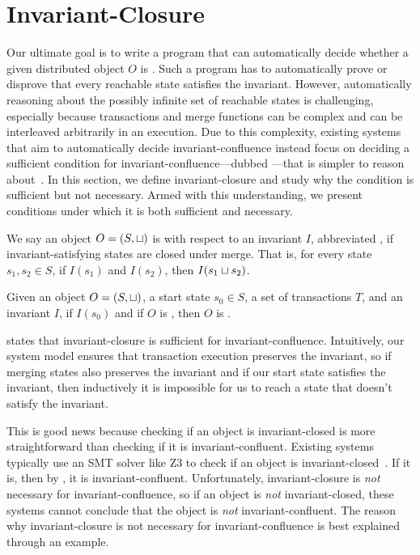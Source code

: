 \section{Invariant-Closure}
Our ultimate goal is to write a program that can automatically decide whether a
given distributed object $O$ is \sTIconfluent{}. Such a program has to
automatically prove or disprove that every reachable state satisfies the
invariant. However, automatically reasoning about the possibly infinite set of
reachable states is challenging, especially because transactions and merge
functions can be complex and can be interleaved arbitrarily in an execution.
Due to this complexity, existing systems that aim to automatically decide
invariant-confluence instead focus on deciding a sufficient condition for
invariant-confluence---dubbed ---that is simpler to
reason about~\cite{li2012making, li2014automating}. In this section, we define
invariant-closure and study why the condition is sufficient but not necessary.
Armed with this understanding, we present conditions under which it is both
sufficient and necessary.

We say an object $O = (S, \sqcup)$ is  with respect to
an invariant $I$, abbreviated , if invariant-satisfying
states are closed under merge. That is, for every state $s_1, s_2 \in S$, if
$I(s_1)$ and $I(s_2)$, then $I(s_1 \sqcup s_2)$.

\begin{theorem}
  Given an object $O = (S, \sqcup)$, a start state $s_0 \in S$, a set of
  transactions $T$, and an invariant $I$, if $I(s_0)$ and if $O$ is \Iclosed{},
  then $O$ is \sTIconfluent{}.
\end{theorem}

 states that invariant-closure is
sufficient for invariant-confluence. Intuitively, our system model ensures that
transaction execution preserves the invariant, so if merging states also
preserves the invariant and if our start state satisfies the invariant, then
inductively it is impossible for us to reach a state that doesn't satisfy the
invariant.

This is good news because checking if an object is invariant-closed is more
straightforward than checking if it is invariant-confluent. Existing systems
typically use an SMT solver like Z3 to check if an object is
invariant-closed~\cite{de2008z3, balegas2015putting, gotsman2016cause}. If it
is, then by , it is invariant-confluent.
Unfortunately, invariant-closure is \emph{not} necessary for
invariant-confluence, so if an object is \emph{not} invariant-closed, these
systems cannot conclude that the object is \emph{not} invariant-confluent. The
reason why invariant-closure is not necessary for invariant-confluence is best
explained through an example.

